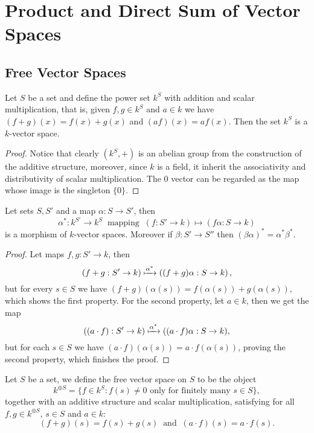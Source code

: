 \section{Product and Direct Sum of Vector Spaces}

\subsection{Free Vector Spaces}

\begin{proposition}
Let \(S\) be a set and define the power set \(k^S\) with addition and
scalar multiplication, that is, given \(f, g \in k^S\) and \(a \in k\) we
have \((f + g)(x) = f(x) + g(x)\) and \((a f)(x) = af(x)\). Then the set
\(k^S\) is a \(k\)-vector space.
\end{proposition}

\begin{proof}
Notice that clearly \((k^S, +)\) is an abelian group from the construction of
the additive structure, moreover, since \(k\) is a field, it inherit the
associativity and distributivity of scalar multiplication. The \(0\) vector
can be regarded as the map whose image is the singleton \(\{0\}\).
\end{proof}

\begin{proposition}[Functoriality of \(k^S\)]
Let sets \(S, S'\) and a map \(\alpha : S \to S'\), then
\[
  \alpha^\ast : k^{S'} \to k^S \ \text{ mapping }\ (f : S' \to k) \mapsto
  (f  \alpha : S \to k)
\]
is a morphism of \(k\)-vector spaces. Moreover if \(\beta : S' \to S''\) then
\((\beta  \alpha)^\ast = \alpha^\ast  \beta^\ast\).
\end{proposition}

\begin{proof}
Let maps \(f, g : S' \to k\), then
\[
  (f + g : S' \to k) \xmapsto{\alpha^\ast} \left( (f + g) \alpha : S
  \to k \right),
\]
but for every \(s \in S\) we have \((f + g)(\alpha(s)) = f(\alpha(s)) +
g(\alpha(s))\), which shows the first property. For the second property, let
\(a \in k\), then we get the map
\[
  ((a \cdot f) : S' \to k) \xmapsto{\alpha^\ast} ( (a \cdot f)  \alpha
  : S \to k),
\]
but for each \(s \in S\) we have \((a \cdot f)(\alpha(s)) = a \cdot
f(\alpha(s))\), proving the second property, which finishes the proof.
\end{proof}

\begin{definition}\label{def: free vector space}
Let \(S\) be a set, we define the free vector space on \(S\) to be the object
\[
  k^{\oplus S} = \{f \in k^S \colon f(s) \neq 0 \text{ only for finitely many }
  s \in S\},
\]
together with an additive structure and scalar multiplication, satisfying for
all \(f, g \in k^{\oplus S}\), \(s \in S\) and \(a \in k\):
\[
  (f + g)(s) = f(s) + g(s)\ \text{ and }\ (a \cdot f)(s) = a \cdot f(s).
\]
\end{definition}

